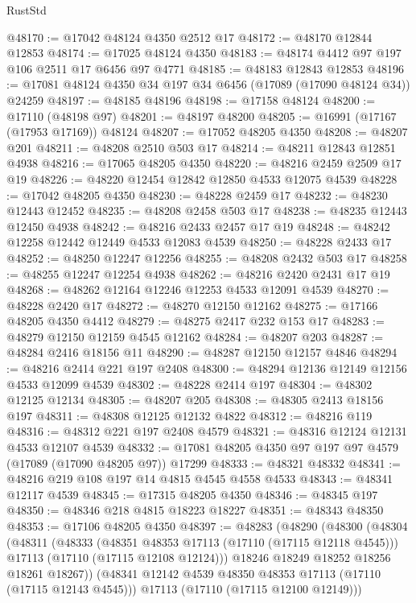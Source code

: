 \begin{lexlean}{RustStd}
\begin{coremodule}
@48170 := @17042 @48124 @4350 @2512 @17
@48172 := @48170 @12844 @12853
@48174 := @17025 @48124 @4350
@48183 := @48174 @4412 @97 @197 @106 @2511 @17 @6456 @97 @4771
@48185 := @48183 @12843 @12853
@48196 := @17081 @48124 @4350 @34 @197 @34 @6456 (@17089 (@17090 @48124 @34)) @24259
@48197 := @48185 @48196
@48198 := @17158 @48124
@48200 := @17110 (@48198 @97)
@48201 := @48197 @48200
@48205 := @16991 (@17167 (@17953 @17169)) @48124
@48207 := @17052 @48205 @4350
@48208 := @48207 @201
@48211 := @48208 @2510 @503 @17
@48214 := @48211 @12843 @12851 @4938
@48216 := @17065 @48205 @4350
@48220 := @48216 @2459 @2509 @17 @19
@48226 := @48220 @12454 @12842 @12850 @4533 @12075 @4539
@48228 := @17042 @48205 @4350
@48230 := @48228 @2459 @17
@48232 := @48230 @12443 @12452
@48235 := @48208 @2458 @503 @17
@48238 := @48235 @12443 @12450 @4938
@48242 := @48216 @2433 @2457 @17 @19
@48248 := @48242 @12258 @12442 @12449 @4533 @12083 @4539
@48250 := @48228 @2433 @17
@48252 := @48250 @12247 @12256
@48255 := @48208 @2432 @503 @17
@48258 := @48255 @12247 @12254 @4938
@48262 := @48216 @2420 @2431 @17 @19
@48268 := @48262 @12164 @12246 @12253 @4533 @12091 @4539
@48270 := @48228 @2420 @17
@48272 := @48270 @12150 @12162
@48275 := @17166 @48205 @4350 @4412
@48279 := @48275 @2417 @232 @153 @17
@48283 := @48279 @12150 @12159 @4545 @12162
@48284 := @48207 @203
@48287 := @48284 @2416 @18156 @11
@48290 := @48287 @12150 @12157 @4846
@48294 := @48216 @2414 @221 @197 @2408
@48300 := @48294 @12136 @12149 @12156 @4533 @12099 @4539
@48302 := @48228 @2414 @197
@48304 := @48302 @12125 @12134
@48305 := @48207 @205
@48308 := @48305 @2413 @18156 @197
@48311 := @48308 @12125 @12132 @4822
@48312 := @48216 @119
@48316 := @48312 @221 @197 @2408 @4579
@48321 := @48316 @12124 @12131 @4533 @12107 @4539
@48332 := @17081 @48205 @4350 @97 @197 @97 @4579 (@17089 (@17090 @48205 @97)) @17299
@48333 := @48321 @48332
@48341 := @48216 @219 @108 @197 @14 @4815 @4545 @4558 @4533
@48343 := @48341 @12117 @4539
@48345 := @17315 @48205 @4350
@48346 := @48345 @197
@48350 := @48346 @218 @4815 @18223 @18227
@48351 := @48343 @48350
@48353 := @17106 @48205 @4350
@48397 := @48283
    (@48290
      (@48300
        (@48304
          (@48311
            (@48333
              (@48351 @48353 @17113 (@17110 (@17115 @12118 @4545)))
              @17113
              (@17110 (@17115 @12108 @12124)))
            @18246
            @18249
            @18252
            @18256
            @18261
            @18267))
        (@48341 @12142 @4539 @48350 @48353 @17113 (@17110 (@17115 @12143 @4545)))
        @17113
        (@17110 (@17115 @12100 @12149)))

\end{coremodule}
\end{lexlean}

